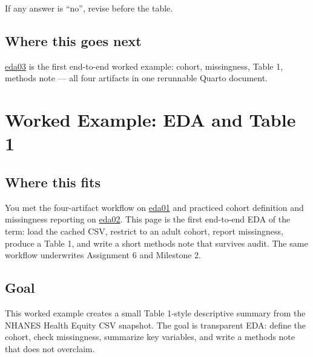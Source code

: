 \documentclass[
  letterpaper,
  DIV=11,
  numbers=noendperiod,
  oneside]{scrreprt}
\begin{document}
If any answer is ``no'', revise before the table.

\section*{Where this goes next}\label{where-this-goes-next-8}


\href{eda03-worked-example.qmd}{eda03} is the first end-to-end worked
example: cohort, missingness, Table 1, methods note --- all four
artifacts in one rerunnable Quarto document.

\chapter*{Worked Example: EDA and Table
1}\label{worked-example-eda-and-table-1}


\section*{Where this fits}\label{where-this-fits-7}


You met the four-artifact workflow on
\hyperref[eda-as-evidence-stewardship]{eda01} and practiced cohort
definition and missingness reporting on
\hyperref[cohort-and-missingness]{eda02}. This page is the first
end-to-end EDA of the term: load the cached CSV, restrict to an adult
cohort, report missingness, produce a Table 1, and write a short methods
note that survives audit. The same workflow underwrites Assignment 6 and
Milestone 2.

\section*{Goal}\label{goal-5}


This worked example creates a small Table 1-style descriptive summary
from the NHANES Health Equity CSV snapshot. The goal is transparent EDA:
define the cohort, check missingness, summarize key variables, and write
a methods note that does not overclaim.
\end{document}

